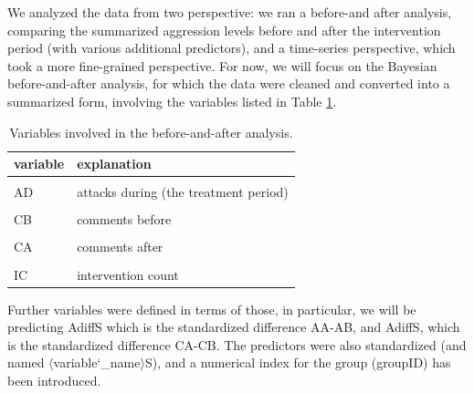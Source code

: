 \documentclass[
  10pt,
  dvipsnames, enabledeprecatedfontcommands]{scrartcl}
\begin{document}
We analyzed the data from two perspective: we ran a before-and after
analysis, comparing the summarized aggression levels before and after
the intervention period (with various additional predictors), and a
time-series perspective, which took a more fine-grained perspective. For
now, we will focus on the Bayesian before-and-after analysis, for which
the data were cleaned and converted into a summarized form, involving
the variables listed in Table \ref{tab:baaVars}.

\vspace{1mm}
\footnotesize

\normalsize

\begin{table}
\centering
\begin{tabular}{ll}
\toprule
variable & explanation\\
\midrule
\cellcolor{gray!6}{AB} & \cellcolor{gray!6}{attacks before (pre-treatment)}\\
AD & attacks during (the treatment period)\\
\cellcolor{gray!6}{AA} & \cellcolor{gray!6}{attacks after (post-treatment)}\\
CB & comments before\\
\cellcolor{gray!6}{CD} & \cellcolor{gray!6}{comments during}\\
CA & comments after\\
\cellcolor{gray!6}{group} & \cellcolor{gray!6}{treatment group}\\
IC & intervention count\\
\bottomrule
\end{tabular}

\caption{Variables involved in the before-and-after analysis.}
\label{tab:baaVars}
\end{table}

Further variables were defined in terms of those, in particular, we will
be predicting \textsf{AdiffS} which is the standardized difference
\textsf{AA}-\textsf{AB}, and \textsf{AdiffS}, which is the standardized
difference \textsf{CA}-\textsf{CB}. The predictors were also
standardized (and named \(\langle\)variable\char`\_name\(\rangle\)S),
and a numerical index for the group (\textsf{groupID}) has been
introduced.

\vspace{1mm}
\footnotesize
\end{document}
